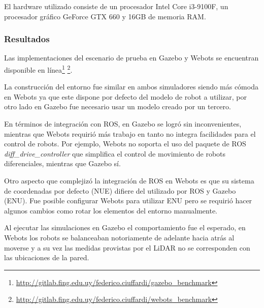 El hardware utilizado consiste de un procesador Intel Core i3-9100F, un procesador
gráfico GeForce GTX 660 y 16GB de memoria RAM.

\subsubsection{Resultados}
Las implementaciones del escenario de prueba en Gazebo y Webots se encuentran
disponible en línea\footnote{\url{http://gitlab.fing.edu.uy/federico.ciuffardi/gazebo_benchmark}}
\footnote{\url{http://gitlab.fing.edu.uy/federico.ciuffardi/webots_benchmark}}. 

La construcción del entorno fue similar en ambos simuladores siendo
más cómoda en Webots ya que este dispone por defecto del modelo de robot a
utilizar, por otro lado en Gazebo fue necesario usar un modelo creado por un
tercero.

En términos de integración con \gls{ROS}, en Gazebo se logró sin inconvenientes, mientras que
Webots requirió más trabajo en tanto no integra facilidades para el control de
robots. Por ejemplo, Webots no soporta el uso del paquete de \gls{ROS}
\emph{diff\_drive\_controller} \cite{diff_drive_controller} que simplifica el
control de movimiento de robots diferenciales, mientras que Gazebo sí.

Otro aspecto que complejizó la integración de \gls{ROS} en Webots es que su sistema
de coordenadas por defecto (\gls{NUE}) difiere del utilizado por \gls{ROS} y Gazebo (\gls{ENU}).
Fue posible configurar Webots para utilizar \gls{ENU} pero se requirió hacer algunos
cambios como rotar los elementos del entorno manualmente.

Al ejecutar las simulaciones en Gazebo el comportamiento fue el esperado, en
Webots los robots se balanceaban notoriamente de adelante hacia atrás al
moverse y a su vez las medidas provistas por el \gls{LiDAR} no se corresponden con
las ubicaciones de la pared.

